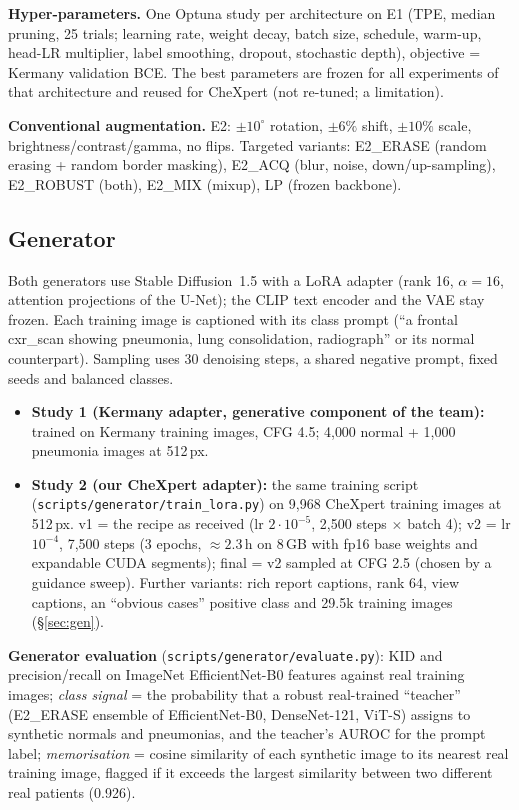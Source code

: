 \documentclass[11pt,a4paper]{article}
\newcommand{\code}[1]{\texttt{\small #1}}
\begin{document}
\textbf{Hyper-parameters.} One Optuna study per architecture on E1 (TPE, median pruning, 25 trials; learning rate, weight decay, batch size, schedule, warm-up, head-LR multiplier, label smoothing, dropout, stochastic depth), objective = Kermany validation BCE. The best parameters are frozen for all experiments of that architecture and reused for CheXpert (not re-tuned; a limitation).

\textbf{Conventional augmentation.} E2: $\pm10^\circ$ rotation, $\pm6\%$ shift, $\pm10\%$ scale, brightness/contrast/gamma, no flips. Targeted variants: E2\_ERASE (random erasing + random border masking), E2\_ACQ (blur, noise, down/up-sampling), E2\_ROBUST (both), E2\_MIX (mixup), LP (frozen backbone).

\subsection{Generator}
Both generators use Stable Diffusion~1.5 \citep{rombach2022} with a LoRA adapter \citep{hu2022} (rank 16, $\alpha=16$, attention projections of the U-Net); the CLIP text encoder and the VAE stay frozen. Each training image is captioned with its class prompt (``a frontal cxr\_scan showing pneumonia, lung consolidation, radiograph'' or its normal counterpart). Sampling uses 30 denoising steps, a shared negative prompt, fixed seeds and balanced classes.
\begin{itemize}
\item \textbf{Study 1 (Kermany adapter, generative component of the team):} trained on Kermany training images, CFG 4.5; 4{,}000 normal + 1{,}000 pneumonia images at 512\,px.
\item \textbf{Study 2 (our CheXpert adapter):} the same training script (\code{scripts/\allowbreak{}generator/\allowbreak{}train\_\allowbreak{}lora.py}) on 9{,}968 CheXpert training images at 512\,px. v1 = the recipe as received (lr $2\cdot10^{-5}$, 2{,}500 steps $\times$ batch 4); v2 = lr $10^{-4}$, 7{,}500 steps (3 epochs, $\approx 2.3$\,h on 8\,GB with fp16 base weights and expandable CUDA segments); final = v2 sampled at CFG 2.5 (chosen by a guidance sweep). Further variants: rich report captions, rank 64, view captions, an ``obvious cases'' positive class and 29.5k training images (\S\ref{sec:gen}).
\end{itemize}

\textbf{Generator evaluation} (\code{scripts/\allowbreak{}generator/\allowbreak{}evaluate.py}): KID and precision/recall on ImageNet EfficientNet-B0 features against real training images; \emph{class signal} = the probability that a robust real-trained ``teacher'' (E2\_ERASE ensemble of EfficientNet-B0, DenseNet-121, ViT-S) assigns to synthetic normals and pneumonias, and the teacher's AUROC for the prompt label; \emph{memorisation} = cosine similarity of each synthetic image to its nearest real training image, flagged if it exceeds the largest similarity between two different real patients (0.926).
\end{document}
